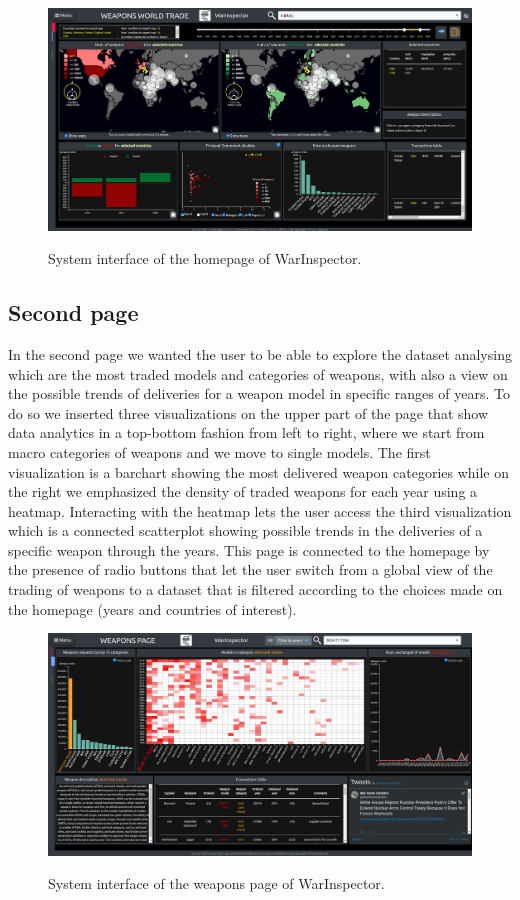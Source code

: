 \documentclass{article}
\begin{document}
\begin{multicols}{2}
\begin{figure}[ht!]
	\centering
	\includegraphics[scale=0.25,center]{./fig/screen1.png}
	\label{fig:va}
	\caption{System interface of the homepage of WarInspector.}
	
\end{figure}

\subsection{Second page}
In the second page we wanted the user to be able to explore the dataset analysing which are the most traded models and categories of weapons, with also a view on the possible trends of deliveries for a weapon model in specific ranges of years.
To do so we inserted three visualizations on the upper part of the page that show data analytics in a top-bottom fashion from left to right, where we start from macro categories of weapons and we move to single models. The first visualization is a barchart showing the most delivered weapon categories while on the right we emphasized the density of traded weapons for each year using  a heatmap. Interacting with the heatmap lets the user access the third visualization which is a connected scatterplot showing possible trends in the deliveries of a specific weapon through the years. 
This page is connected to the homepage by the presence of radio buttons that let the user switch from a global view of the trading of weapons to a dataset that is filtered according to the choices made on the homepage (years and countries of interest). 


\begin{figure}[tb]
\centering
\includegraphics[scale=0.25,center]{./fig/screen2.png}
   \label{fig:va2}
    \caption{System interface of the weapons page of WarInspector.}


\end{figure}
\end{multicols}
\end{document}
